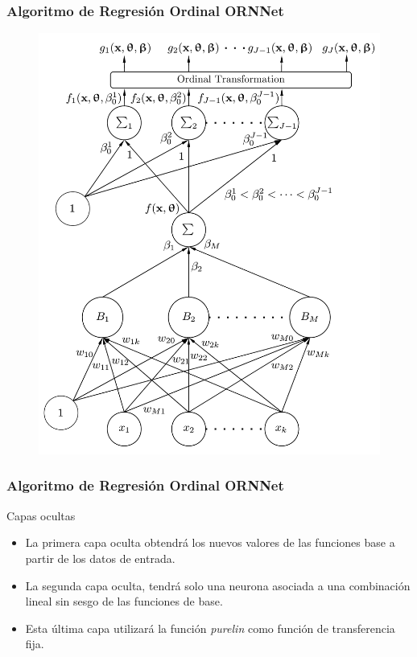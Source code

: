 \documentclass[compress,allowframebreaks]{beamer}
\begin{document}
			\begin{frame}
				\frametitle{\normalsize Algoritmo de Regresión Ordinal ORNNet}
				
				\begin{figure}[h]
					\centering
					\includegraphics[scale=0.3]{img/ORNNet.pdf}
				\end{figure}
			\end{frame}
				
			\begin{frame}
				\frametitle{\normalsize Algoritmo de Regresión Ordinal ORNNet}
				
				\begin{block}{Capas ocultas}
					\begin{itemize}\justifying
						\item La primera capa oculta obtendrá los nuevos valores de las funciones base a partir de los datos de entrada.
						\item La segunda capa oculta, tendrá solo una neurona asociada a una combinación lineal sin sesgo de las funciones de base.
						\item Esta última capa utilizará la función \textit{purelin} como función de transferencia fija.
					\end{itemize}
				\end{block}
			\end{frame}
			
\end{document}
